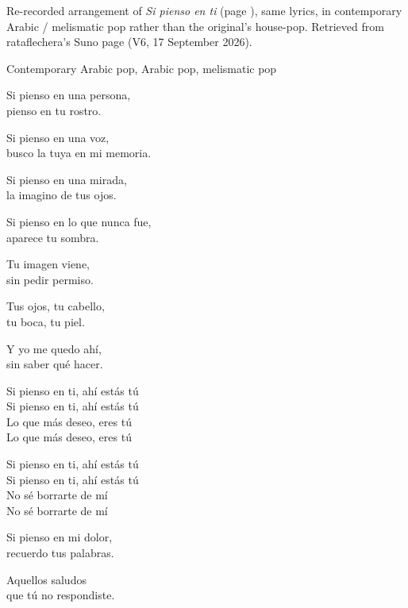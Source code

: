 
\begin{notes}
Re-recorded arrangement of \emph{Si pienso en ti} (page \pageref{sec:si-pienso-en-ti}), same lyrics, in contemporary Arabic / melismatic pop rather than the original's house-pop. Retrieved from rataflechera's Suno page (V6, 17 September 2026).
\end{notes}
\begin{style}
Contemporary Arabic pop, Arabic pop, melismatic pop
\end{style}
\begin{lyrics}
Si pienso en una persona,\\
pienso en tu rostro.

Si pienso en una voz,\\
busco la tuya en mi memoria.

Si pienso en una mirada,\\
la imagino de tus ojos.

Si pienso en lo que nunca fue,\\
aparece tu sombra.

Tu imagen viene,\\
sin pedir permiso.

Tus ojos, tu cabello,\\
tu boca, tu piel.

Y yo me quedo ahí,\\
sin saber qué hacer.

Si pienso en ti, ahí estás tú\\
Si pienso en ti, ahí estás tú\\
Lo que más deseo, eres tú\\
Lo que más deseo, eres tú

Si pienso en ti, ahí estás tú\\
Si pienso en ti, ahí estás tú\\
No sé borrarte de mí\\
No sé borrarte de mí

Si pienso en mi dolor,\\
recuerdo tus palabras.

Aquellos saludos\\
que tú no respondiste.


\end{lyrics}
